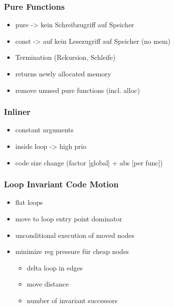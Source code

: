 \documentclass[navbaroff,en]{sdqbeamer}
\begin{document}
\begin{frame}
    \frametitle{Pure Functions}

    \begin{itemize}
        \item pure -> kein Schreibzugriff auf Speicher
        \item const -> auf kein Lesezugriff auf Speicher (no mem)
        \item Termination (Rekursion, Schleife)
        \item returns newly allocated memory
        \item remove unused pure functions (incl. alloc)
    \end{itemize}

\end{frame}

\begin{frame}
    \frametitle{Inliner}

    \begin{itemize}
        \item constant arguments
        \item inside loop -> high prio
        \item code size change (factor [global] + abs [per func])
    \end{itemize}

\end{frame}

\begin{frame}
    \frametitle{Loop Invariant Code Motion}

    \begin{itemize}
        \item flat loops
        \item move to loop entry point dominator
        \item unconditional execution of moved nodes
        \item minimize reg pressure für cheap nodes
        \begin{itemize}
            \item delta loop in edges
            \item move distance
            \item number of invariant successors
        \end{itemize}
    \end{itemize}

\end{frame}
\end{document}

